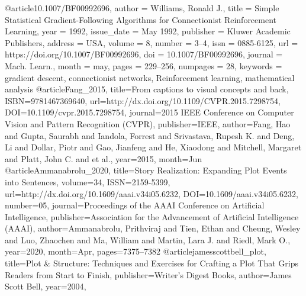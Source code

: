 @article{10.1007/BF00992696,
author = {Williams, Ronald J.},
title = {Simple Statistical Gradient-Following Algorithms for Connectionist Reinforcement Learning},
year = {1992},
issue_date = {May 1992},
publisher = {Kluwer Academic Publishers},
address = {USA},
volume = {8},
number = {3–4},
issn = {0885-6125},
url = {https://doi.org/10.1007/BF00992696},
doi = {10.1007/BF00992696},
journal = {Mach. Learn.},
month = may,
pages = {229–256},
numpages = {28},
keywords = {gradient descent, connectionist networks, Reinforcement learning, mathematical analysis}
}
@article{Fang_2015,
   title={From captions to visual concepts and back},
   ISBN={9781467369640},
   url={http://dx.doi.org/10.1109/CVPR.2015.7298754},
   DOI={10.1109/cvpr.2015.7298754},
   journal={2015 IEEE Conference on Computer Vision and Pattern Recognition (CVPR)},
   publisher={IEEE},
   author={Fang, Hao and Gupta, Saurabh and Iandola, Forrest and Srivastava, Rupesh K. and Deng, Li and Dollar, Piotr and Gao, Jianfeng and He, Xiaodong and Mitchell, Margaret and Platt, John C. and et al.},
   year={2015},
   month={Jun}
}
@article{Ammanabrolu_2020,
   title={Story Realization: Expanding Plot Events into Sentences},
   volume={34},
   ISSN={2159-5399},
   url={http://dx.doi.org/10.1609/aaai.v34i05.6232},
   DOI={10.1609/aaai.v34i05.6232},
   number={05},
   journal={Proceedings of the AAAI Conference on Artificial Intelligence},
   publisher={Association for the Advancement of Artificial Intelligence (AAAI)},
   author={Ammanabrolu, Prithviraj and Tien, Ethan and Cheung, Wesley and Luo, Zhaochen and Ma, William and Martin, Lara J. and Riedl, Mark O.},
   year={2020},
   month={Apr},
   pages={7375–7382}
}
@article{jamesscottbell_plot,
   title={Plot \& Structure: Techniques and Exercises for Crafting a Plot That Grips Readers from Start to Finish},
   publisher={Writer’s Digest Books},
   author={James Scott Bell},
   year={2004},
}

